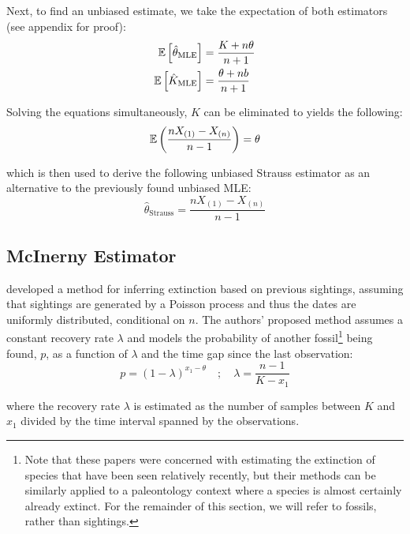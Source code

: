 Next, to find an unbiased estimate, we take the expectation of both estimators (see appendix for proof):
\begin{align*}
    \mathbb{E} \left[ \hat\theta_{\text{MLE}} \right] &= \frac{K + n\theta}{n+1} \\
    \mathbb{E} \left[ \hat K_{\text{MLE}} \right]  &= \frac{\theta + nb}{n+1}
\end{align*}

Solving the equations simultaneously, $K$ can be eliminated to yields the following:
\[
\mathbb{E} \left( \frac{nX_{(1)} - X_{(n)}}{n-1} \right) = \theta
\]

which is then used to derive the following unbiased Strauss estimator as an alternative to the previously found unbiased MLE:
\begin{equation}\label{eq:strauss}
\hat\theta_{\text{Strauss}} = \frac{n X_{(1)} - X_{(n)}}{n-1}
\end{equation}




\subsection{McInerny Estimator}

\textcite{Mcinerny2006} developed a method for inferring extinction based on previous sightings, assuming that sightings are generated by a Poisson process and thus the dates are uniformly distributed, conditional on $n$. The authors' proposed method assumes a constant recovery rate $\lambda$ and models the probability of another fossil\footnote{Note that these papers were concerned with estimating the extinction of species that have been seen relatively recently, but their methods can be similarly applied to a paleontology context where a species is almost certainly already extinct. For the remainder of this section, we will refer to fossils, rather than sightings.} being found, $p$, as a function of $\lambda$ and the time gap since the last observation:
\[
p = \left( 1 - \lambda \right)^{x_1 - \theta} \quad;\quad \lambda = \frac{n-1}{K - x_1}
\]

where the recovery rate $\lambda$ is estimated as the number of samples between $K$ and $x_1$ divided by the time interval spanned by the observations.

